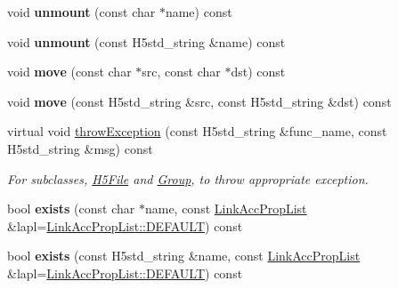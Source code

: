\begin{DoxyCompactItemize}
\item 
\mbox{\label{class_h5_1_1_h5_location_adf0ced1df2202e28f2b53adf8d0478c9}} 
void {\bfseries unmount} (const char $\ast$name) const
\item 
\mbox{\label{class_h5_1_1_h5_location_a1c84c3ded23fa97ea435c53c96f551fe}} 
void {\bfseries unmount} (const H5std\+\_\+string \&name) const
\item 
\mbox{\label{class_h5_1_1_h5_location_a17120f41e6a9f61ad85104597b0bfbb3}} 
void {\bfseries move} (const char $\ast$src, const char $\ast$dst) const
\item 
\mbox{\label{class_h5_1_1_h5_location_a4c98e9e65259cfef50f595ac0481283c}} 
void {\bfseries move} (const H5std\+\_\+string \&src, const H5std\+\_\+string \&dst) const
\item 
\mbox{\label{class_h5_1_1_h5_location_a8ceb2955cdcf2793ebaa3deafff6a051}} 
virtual void \hyperlink{class_h5_1_1_h5_location_a8ceb2955cdcf2793ebaa3deafff6a051}{throw\+Exception} (const H5std\+\_\+string \&func\+\_\+name, const H5std\+\_\+string \&msg) const
\begin{DoxyCompactList}\small\item\em For subclasses, \hyperlink{class_h5_1_1_h5_file}{H5\+File} and \hyperlink{class_h5_1_1_group}{Group}, to throw appropriate exception. \end{DoxyCompactList}\item 
\mbox{\label{class_h5_1_1_h5_location_a6556c6f3718bb137af4356e33c0cfa4e}} 
bool {\bfseries exists} (const char $\ast$name, const \hyperlink{class_h5_1_1_link_acc_prop_list}{Link\+Acc\+Prop\+List} \&lapl=\hyperlink{class_h5_1_1_link_acc_prop_list_abbf34b03d8f8c9cf225c704d59ebb7a8}{Link\+Acc\+Prop\+List\+::\+D\+E\+F\+A\+U\+LT}) const
\item 
\mbox{\label{class_h5_1_1_h5_location_a9ca7f994ac110ecb1068151fbd7ee903}} 
bool {\bfseries exists} (const H5std\+\_\+string \&name, const \hyperlink{class_h5_1_1_link_acc_prop_list}{Link\+Acc\+Prop\+List} \&lapl=\hyperlink{class_h5_1_1_link_acc_prop_list_abbf34b03d8f8c9cf225c704d59ebb7a8}{Link\+Acc\+Prop\+List\+::\+D\+E\+F\+A\+U\+LT}) const

\end{DoxyCompactItemize}
